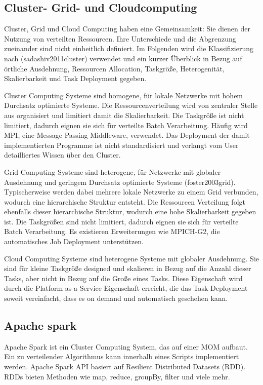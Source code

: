 \subsection{Cluster- Grid- und Cloudcomputing}
Cluster, Grid und Cloud Computing haben eine Gemeinsamkeit:
Sie dienen der Nutzung von verteilten Ressourcen.
Ihre Unterschiede und die Abgrenzung zueinander sind nicht einheitlich definiert.
Im Folgenden wird die Klassifizierung nach (sadashiv2011cluster) verwendet und ein kurzer Überblick in Bezug auf örtliche Ausdehnung, Ressourcen Allocation, Taskgröße, Heterogenität, Skalierbarkeit und Task Deployment gegeben.

Cluster Computing Systeme sind homogene, für lokale Netzwerke mit hohem Durchsatz optimierte Systeme.
Die Ressourcenverteilung wird von zentraler Stelle aus organisiert und limitiert damit die Skalierbarkeit.
Die Taskgröße ist nicht limitiert, dadurch eignen sie sich für verteilte Batch Verarbeitung.
Häufig wird MPI, eine Message Passing Middleware, verwendet.
Das Deployment der damit implementierten Programme ist nicht standardisiert und verlangt vom User detailliertes Wissen über den Cluster.

Grid Computing Systeme sind heterogene, für Netzwerke mit globaler Ausdehnung und geringem Durchsatz optimierte Systeme (foster2003grid).
Typischerweise werden dabei mehrere lokale Netzwerke zu einem Grid verbunden, wodurch eine hierarchische Struktur entsteht.
Die Ressourcen Verteilung folgt ebenfalls dieser hierarchische Struktur, wodurch eine hohe Skalierbarkeit gegeben ist.
Die Taskgrößen sind nicht limitiert, dadurch eignen sie sich für verteilte Batch Verarbeitung.
Es existieren Erweiterungen wie MPICH-G2, die automatisches Job Deployment unterstützen.

Cloud Computing Systeme sind heterogene Systeme mit globaler Ausdehnung.
Sie sind für kleine Taskgröße designed und skalieren in Bezug auf die Anzahl dieser Tasks, aber nicht in Bezug auf die Große eines Tasks.
Diese Eigenschaft wird durch die Platform as a Service Eigenschaft erreicht, die das Task Deployment soweit vereinfacht, dass es on demand und automatisch geschehen kann.





\subsection{Apache spark}
Apache Spark ist ein Cluster Computing System, das auf einer MOM aufbaut.
Ein zu verteilender Algorithmus kann innerhalb eines Scripts implementiert werden.
Apache Spark API basiert auf Resilient Distributed Datasets (RDD).
RDDs bieten Methoden wie map, reduce, groupBy, filter und viele mehr.

